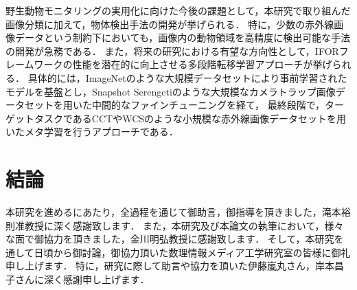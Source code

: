 \documentclass[a4paper,11pt,nomag]{jsreport}
\begin{document}
野生動物モニタリングの実用化に向けた今後の課題として，本研究で取り組んだ画像分類に加えて，物体検出手法の開発が挙げられる．
特に，少数の赤外線画像データという制約下においても，画像内の動物領域を高精度に検出可能な手法の開発が急務である．
また，将来の研究における有望な方向性として，IFORフレームワークの性能を潜在的に向上させる多段階転移学習アプローチが挙げられる．
具体的には，ImageNetのような大規模データセットにより事前学習されたモデルを基盤とし，Snapshot Serengetiのような大規模なカメラトラップ画像データセットを用いた中間的なファインチューニングを経て，
最終段階で，ターゲットタスクであるCCTやWCSのような小規模な赤外線画像データセットを用いたメタ学習を行うアプローチである．

\chapter*{結論}

本研究を進めるにあたり，全過程を通じて御助言，御指導を頂きました，滝本裕則准教授に深く感謝致します．
また，本研究及び本論文の執筆において，様々な面で御協力を頂きました，金川明弘教授に感謝致します．
そして，本研究を通して日頃から御討論，御協力頂いた数理情報メディア工学研究室の皆様に御礼申し上げます．
特に，研究に際して助言や協力を頂いた伊藤嵐丸さん，岸本昌子さんに深く感謝申し上げます．



\end{document}
